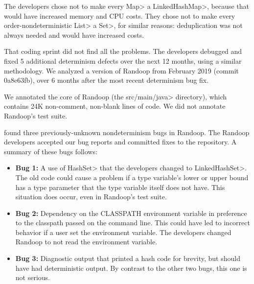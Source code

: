 The developers chose not to make every \<Map> a \<LinkedHashMap>, because that
would have increased memory and CPU costs.  They chose not to make every
order-nondeterministic \<List> a \<Set>, for similar reasons:  deduplication was
not always needed and would have increased costs.


That coding sprint did not find all the problems.
The developers debugged and fixed 5 additional determinism defects over the
next 12 months, using a similar methodology.
We analyzed a version of Randoop from February 2019 (commit 0a8e63fb), over 6 months after the most recent determinism bug fix.

We annotated the core of Randoop (the \<src/main/java> directory), which
contains 24K non-comment, non-blank lines of code.
We did not annotate Randoop's test suite.



\TheDeterminismChecker found three previously-unknown nondeterminism bugs in Randoop.
The Randoop developers accepted our bug reports and committed fixes to the repository. A summary
of these bugs follows:

\begin{itemize}
\item \textbf{Bug 1:}
  A use of \<HashSet> that the developers changed to \<LinkedHashSet>.
The old code could cause a problem if a type variable's lower or upper
bound has a type parameter that the type variable itself does not have.
This situation does occur, even in Randoop's test suite.

\item \textbf{Bug 2:}
Dependency on the CLASSPATH environment variable in preference to the
classpath passed on the command line.
This could have led to incorrect behavior if a user set the environment variable.
The developers changed Randoop to not read the environment variable.

\item  \textbf{Bug 3:}
Diagnostic output that printed a hash code for brevity, but should have had deterministic output.  By contrast to the other two bugs, this one is not serious.
\end{itemize}

